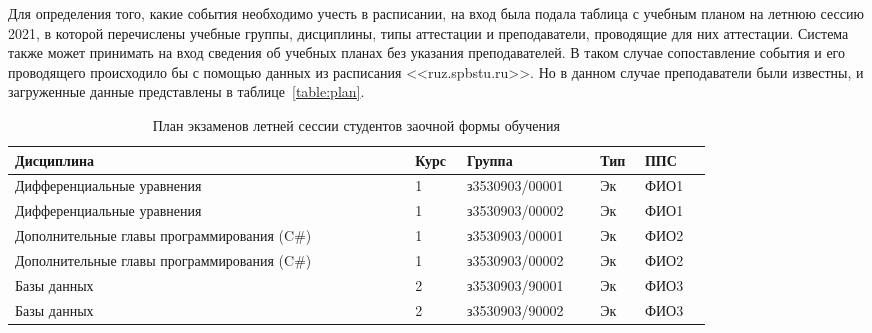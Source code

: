 Для определения того, какие события необходимо учесть в расписании, на вход была подала таблица с учебным планом на летнюю сессию 2021, в которой перечислены учебные группы, дисциплины, типы аттестации и преподаватели, проводящие для них аттестации. Система также может принимать на вход сведения об учебных планах без указания преподавателей. В таком случае сопоставление события и его проводящего происходило бы с помощью данных из расписания <<ruz.spbstu.ru>>. Но в данном случае преподаватели были известны, и загруженные данные представлены в таблице~\ref{table:plan}.
\begin{table}[htbp]
	\centering\small 
	\caption{План экзаменов летней сессии студентов заочной формы обучения}%
	\begin{tabular}{|p{0.48\linewidth}|p{0.05\linewidth}|p{0.16\linewidth}|p{0.04\linewidth}|p{0.08\linewidth}|}
		\hline
		Дисциплина&Курс&Группа&Тип&ППС \\ 	\hline
		Дифференциальные уравнения                                                    & 1                                                & з3530903/00001                                     & Эк                                                         & ФИО1          \\ 	\hline
		Дифференциальные уравнения                                                    & 1                                                & з3530903/00002                                     & Эк                                                         & ФИО1          \\	\hline
		Дополнительные главы программирования (C\#)                                   & 1                                                & з3530903/00001                                     & Эк                                                         & ФИО2          \\ 	\hline
		Дополнительные главы программирования (C\#)                                   & 1                                                & з3530903/00002                                     & Эк                                                         & ФИО2          \\ 	\hline
		Базы данных                                                                   & 2                                                & з3530903/90001                                     & Эк                                                         & ФИО3          \\	\hline
		Базы данных                                                                   & 2                                                & з3530903/90002                                     & Эк                                                         & ФИО3          \\	\hline

\end{tabular}
\end{table}

